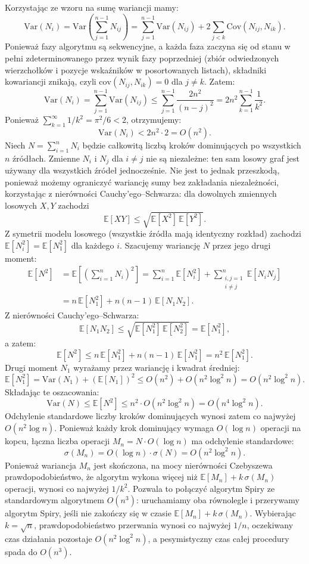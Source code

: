 Korzystając ze wzoru na sumę wariancji mamy:
\[
\mathrm{Var}(N_i) = \mathrm{Var}\!\left(\sum_{j=1}^{n-1} N_{ij}\right)
= \sum_{j=1}^{n-1} \mathrm{Var}(N_{ij})
  + 2\sum_{j < k} \mathrm{Cov}(N_{ij}, N_{ik}).
\]
Ponieważ fazy algorytmu są sekwencyjne, a każda faza zaczyna się
od stanu w pełni zdeterminowanego przez wynik fazy poprzedniej
(zbiór odwiedzonych wierzchołków i pozycje wskaźników
w posortowanych listach), składniki kowariancji znikają, czyli 
$\mathrm{cov}(N_{ij}, N_{ik}) = 0$ dla $j \neq k$. Zatem:
\[
\mathrm{Var}(N_i) = \sum_{j=1}^{n-1} \mathrm{Var}(N_{ij})
\leq \sum_{j=1}^{n-1} \frac{2n^2}{(n-j)^2}
= 2n^2 \sum_{k=1}^{n-1} \frac{1}{k^2}.
\]
Ponieważ $\sum_{k=1}^{\infty} 1/k^2 = \pi^2/6 < 2$, otrzymujemy:
\[
\mathrm{Var}(N_i) < 2n^2 \cdot 2 = O(n^2).
\]
Niech $N = \sum_{i=1}^{n} N_i$ będzie całkowitą liczbą kroków
dominujących po wszystkich $n$ źródłach. Zmienne $N_i$
i $N_j$ dla $i \neq j$ nie są niezależne: ten sam losowy graf jest używany dla wszystkich źródeł jednocześnie.
Nie jest to jednak przeszkodą, ponieważ możemy ograniczyć wariancję
sumy bez zakładania niezależności, korzystając z nierówności
Cauchy'ego--Schwarza: dla dowolnych zmiennych
losowych $X, Y$ zachodzi
\[
\mathbb{E}[XY] \leq \sqrt{\mathbb{E}[X^2]\,\mathbb{E}[Y^2]}.
\]
Z symetrii modelu losowego (wszystkie źródła mają identyczny rozkład) zachodzi $\mathbb{E}[N_i^2] = \mathbb{E}[N_1^2]$ dla
każdego $i$. Szacujemy wariancję $N$ przez jego drugi moment:
\begin{align*}
\mathbb{E}[N^2]
&= \mathbb{E}\!\left[\left(\sum_{i=1}^{n} N_i\right)^{\!2}\right]
 = \sum_{i=1}^{n} \mathbb{E}[N_i^2]
   + \sum_{\substack{i,j=1 \\ i \neq j}}^{n} \mathbb{E}[N_i N_j] \\
&= n\,\mathbb{E}[N_1^2] + n(n-1)\,\mathbb{E}[N_1 N_2].
\end{align*}
Z nierówności Cauchy'ego--Schwarza:
\[
\mathbb{E}[N_1 N_2] \leq \sqrt{\mathbb{E}[N_1^2]\,\mathbb{E}[N_2^2]}
= \mathbb{E}[N_1^2],
\]
a zatem:
\[
\mathbb{E}[N^2] \leq n\,\mathbb{E}[N_1^2] + n(n-1)\,\mathbb{E}[N_1^2]
= n^2\,\mathbb{E}[N_1^2].
\]
Drugi moment $N_1$ wyrażamy przez wariancję i kwadrat średniej:
\[
\mathbb{E}[N_1^2] = \mathrm{Var}(N_1) + (\mathbb{E}[N_1])^2
\leq O(n^2) + O(n^2 \log^2 n)
= O(n^2 \log^2 n).
\]
Składając te oszacowania:
\[
\mathrm{Var}(N) \leq \mathbb{E}[N^2]
\leq n^2 \cdot O(n^2 \log^2 n)
= O(n^4 \log^2 n).
\]
Odchylenie standardowe liczby kroków dominujących wynosi zatem co
najwyżej $O(n^2 \log n)$. Ponieważ każdy krok dominujący wymaga
$O(\log n)$ operacji na kopcu, łączna liczba operacji $M_n = N \cdot O(\log n)$
ma odchylenie standardowe:
\[
\sigma(M_n) = O(\log n) \cdot \sigma(N) = O(n^2 \log^2 n).
\]
Ponieważ wariancja $M_n$ jest skończona, na mocy nierówności
Czebyszewa prawdopodobieństwo, że algorytm wykona
więcej niż $\mathbb{E}[M_n] + k\,\sigma(M_n)$ operacji, wynosi co
najwyżej $1/k^2$. Pozwala to połączyć algorytm Spiry
ze standardowym algorytmem $O(n^3)$: uruchamiamy oba równolegle
i przerywamy algorytm Spiry, jeśli nie zakończy się w czasie
$\mathbb{E}[M_n] + k\,\sigma(M_n)$. Wybierając $k = \sqrt{n}$,
prawdopodobieństwo przerwania wynosi co najwyżej $1/n$, oczekiwany
czas działania pozostaje $O(n^2 \log^2 n)$, a pesymistyczny czas
całej procedury spada do $O(n^3)$.

